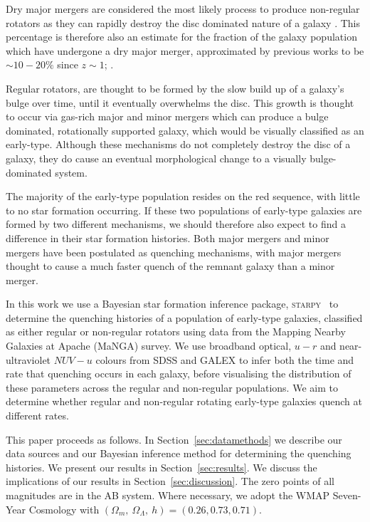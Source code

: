 \documentclass[useAMS,usenatbib]{mn2e}
\begin{document}
Dry major mergers are considered the most likely process to produce non-regular rotators \citep{duc11, naab14} as they can rapidly destroy the disc dominated nature of a galaxy \citep{toomre72}. This percentage is therefore also an estimate for the fraction of the galaxy population which have undergone a dry major merger, approximated by previous works to be $\sim10-20\%$ since $z\sim1$; \citep[][]{khochfar09}.

Regular rotators, are thought to be formed by the slow build up of a galaxy's bulge over time, until it eventually overwhelms the disc. This growth is thought to occur via gas-rich major and minor mergers \citep{duc11} which can produce a bulge dominated, rotationally supported galaxy, which would be visually classified as an early-type. Although these mechanisms do not completely destroy the disc of a galaxy, they do cause an eventual morphological change to a visually bulge-dominated system.

The majority of the early-type population resides on the red sequence, with little to no star formation occurring. If these two populations of early-type galaxies are formed by two different mechanisms, we should therefore also expect to find a difference in their star formation histories. Both major mergers and minor mergers have been postulated as quenching mechanisms, with major mergers thought to cause a much faster quench of the remnant galaxy than a minor merger. 

In this work we use a Bayesian star formation inference package, \textsc{starpy}~ to determine the quenching histories of a population of early-type galaxies, classified as either regular or non-regular rotators using data from the Mapping Nearby Galaxies at Apache (MaNGA) survey. We use broadband optical, $u-r$ and near-ultraviolet $NUV-u$ colours from SDSS and GALEX to infer both the time and rate that quenching occurs in each galaxy, before visualising the distribution of these parameters across the regular and non-regular populations. We aim to determine whether regular and non-regular rotating early-type galaxies quench at different rates. 

This paper proceeds as follows. In Section~\ref{sec:datamethods} we describe our data sources and our Bayesian inference method for determining the quenching histories. We present our results in Section~\ref{sec:results}. We discuss the implications of our results in Section~\ref{sec:discussion}. The zero points of all magnitudes are in the AB system. Where necessary, we adopt the WMAP Seven-Year Cosmology \citep{jarosik11} with $(\Omega_m , ~\Omega_\Lambda , ~h) = (0.26, 0.73, 0.71)$.
\end{document}
